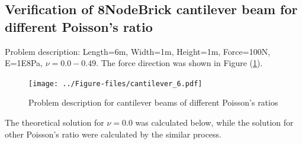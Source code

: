 \documentclass[fleqn,11pt]{article}
\begin{document}







\newpage
\subsection{Verification of 8NodeBrick cantilever beam for different Poisson's ratio}




Problem description: Length=6m, Width=1m, Height=1m, Force=100N, E=1E8Pa, $\nu=0.0-0.49$. The force direction was shown in Figure (\ref{fig Problem description for cantilever beams of different Poisson's ratios}). 

\begin{figure}[H]
  \centering
  \texttt{[image: ../Figure-files/cantilever\_6.pdf]}
  \caption{Problem description for cantilever beams of different Poisson's ratios}
  \label{fig Problem description for cantilever beams of different Poisson's ratios}
\end{figure}

The theoretical solution for $\nu=0.0$ was calculated below, while the solution for other Poisson's ratio were calculated by the similar process. 
\end{document}
